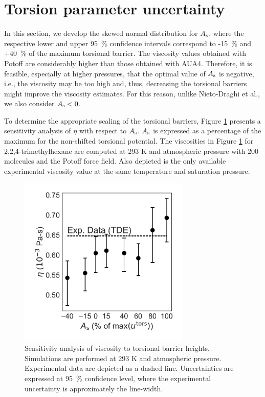 \documentclass[preprint,review,11pt]{elsarticle}
\begin{document}
    \clearpage
	\newpage
	
    \section{Torsion parameter uncertainty} \label{SI:MCMC torsions}
	
%	
%	 
%	
%	
%	
	
	
	In this section, we develop the skewed normal distribution for $A_{\rm s}$, where the respective lower and upper 95~\% confidence intervals correspond to -15~\% and +40~\% of the maximum torsional barrier. The viscosity values obtained with Potoff are considerably higher than those obtained with AUA4. Therefore, it is feasible, especially at higher pressures, that the optimal value of $A_{\rm s}$ is negative, i.e., the viscosity may be too high and, thus, decreasing the torsional barriers might improve the viscosity estimates. For this reason, unlike Nieto-Draghi et al., we also consider $A_{\rm s} < 0$.
	
	To determine the appropriate scaling of the torsional barriers, Figure \ref{fig:sensitivity_torsions} presents a sensitivity analysis of $\eta$ with respect to $A_{\rm s}$. $A_{\rm s}$ is expressed as a percentage of the maximum for the non-shifted torsional potential. The viscosities in Figure \ref{fig:sensitivity_torsions} for 2,2,4-trimethylhexane are computed at 293 K and atmospheric pressure with 200 molecules and the Potoff force field. Also depicted is the only available experimental viscosity value at the same temperature and saturation pressure. 	 
	
	\begin{figure}[htb!]
		\centering
				\includegraphics[width=3.2in]{sensitivity_torsions.pdf}
		\caption{Sensitivity analysis of viscosity to torsional barrier heights. Simulations are performed at 293 K and atmospheric pressure. Experimental data are depicted as a dashed line. Uncertainties are expressed at 95~\% confidence level, where the experimental uncertainty is approximately the line-width.}
		\label{fig:sensitivity_torsions}
	\end{figure}
	
\end{document}
